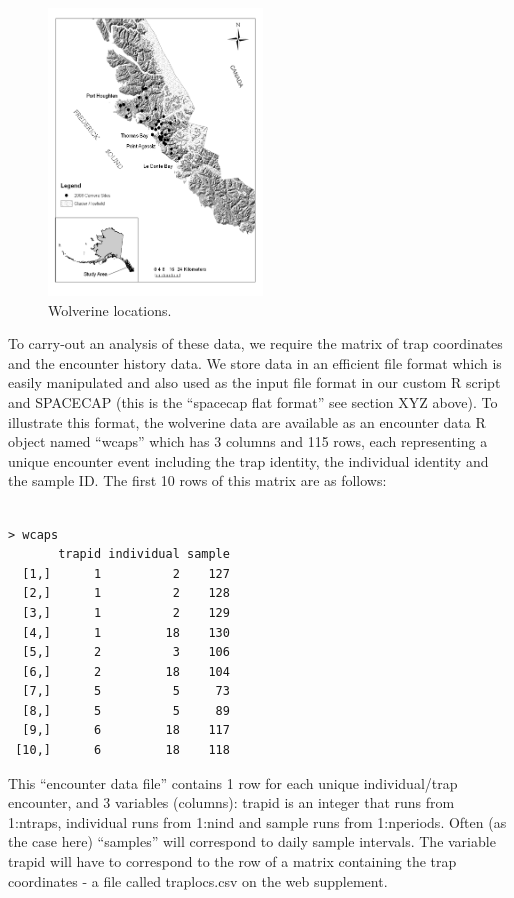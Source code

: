 \begin{figure}
\begin{center}
\includegraphics[height=3in]{figs/wolverinelocs}
\end{center}
\caption{Wolverine locations.}
\label{scr0.fig.wolverinelocs}
\end{figure}

To carry-out an analysis of these data, we require the matrix of trap coordinates and the encounter history data.  We store data in an efficient file format which is easily manipulated and also used as the input file format in our custom R script and SPACECAP (this is the ``spacecap flat format'' see section XYZ above). To illustrate this format, the wolverine data are available as an encounter data R object named ``wcaps'' which has 3 columns and 115 rows, each representing a unique encounter event including the trap identity, the individual identity and the sample ID.  The first 10 rows of this matrix are as follows:

\begin{verbatim}

> wcaps
       trapid individual sample
  [1,]      1          2    127
  [2,]      1          2    128
  [3,]      1          2    129
  [4,]      1         18    130
  [5,]      2          3    106
  [6,]      2         18    104
  [7,]      5          5     73
  [8,]      5          5     89
  [9,]      6         18    117
 [10,]      6         18    118

\end{verbatim}

This ``encounter data file'' contains 1 row for each unique individual/trap encounter, and 3 variables (columns): trapid is an integer that runs from 1:ntraps, individual runs from 1:nind and sample runs from 1:nperiods. Often (as the case here) ``samples'' will correspond to daily sample intervals. The variable trapid will have to correspond to the row of a matrix containing the trap coordinates - a file called traplocs.csv on the web supplement.


